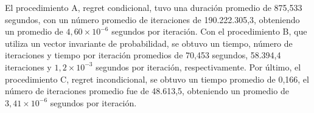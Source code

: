  El procedimiento A, regret condicional, tuvo una duración promedio de 875,533 segundos, con un número promedio de iteraciones de 190.222.305,3, obteniendo un promedio de $4,60 {\times} 10^{-6}$ segundos por iteración. Con el procedimiento B, que utiliza un vector invariante de probabilidad, se obtuvo un tiempo, número de iteraciones y tiempo por iteración promedios de 70,453 segundos, 58.394,4 iteraciones y $1,2 {\times} 10^{-3}$ segundos por iteración, respectivamente. Por último, el procedimiento C, regret incondicional, se obtuvo un tiempo promedio de 0,166, el número de iteraciones promedio fue de 48.613,5, obteniendo un promedio de $3,41 {\times} 10^{-6}$ segundos por iteración.
 
